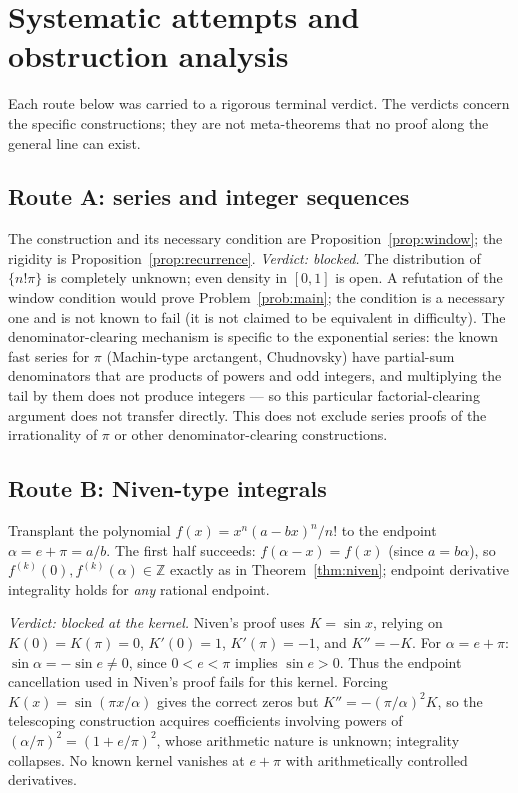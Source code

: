 \documentclass[11pt]{amsart}
\theoremstyle{definition}
\theoremstyle{remark}
\numberwithin{equation}{section}
\newcommand{\Z}{\mathbb{Z}}
\begin{document}
\section{Systematic attempts and obstruction analysis}\label{sec:obstructions}

Each route below was carried to a rigorous terminal verdict. The verdicts concern the specific constructions; they are not meta-theorems that no proof along the general line can exist.

\subsection{Route A: series and integer sequences}

The construction and its necessary condition are Proposition~\ref{prop:window}; the rigidity is Proposition~\ref{prop:recurrence}. \emph{Verdict: blocked.} The distribution of $\{n!\pi\}$ is completely unknown; even density in $[0,1]$ is open. A refutation of the window condition would prove Problem~\ref{prob:main}; the condition is a necessary one and is not known to fail (it is not claimed to be equivalent in difficulty). The denominator-clearing mechanism is specific to the exponential series: the known fast series for $\pi$ (Machin-type arctangent, Chudnovsky) have partial-sum denominators that are products of powers and odd integers, and multiplying the tail by them does not produce integers --- so this particular factorial-clearing argument does not transfer directly. This does not exclude series proofs of the irrationality of $\pi$ or other denominator-clearing constructions.

\subsection{Route B: Niven-type integrals}

Transplant the polynomial $f(x)=x^n(a-bx)^n/n!$ to the endpoint $\alpha=e+\pi=a/b$. The first half succeeds: $f(\alpha-x)=f(x)$ (since $a=b\alpha$), so $f^{(k)}(0),f^{(k)}(\alpha)\in\Z$ exactly as in Theorem~\ref{thm:niven}; endpoint derivative integrality holds for \emph{any} rational endpoint.

\emph{Verdict: blocked at the kernel.} Niven's proof uses $K=\sin x$, relying on $K(0)=K(\pi)=0$, $K'(0)=1$, $K'(\pi)=-1$, and $K''=-K$. For $\alpha=e+\pi$: $\sin\alpha=-\sin e\ne0$, since $0<e<\pi$ implies $\sin e>0$. Thus the endpoint cancellation used in Niven's proof fails for this kernel. Forcing $K(x)=\sin(\pi x/\alpha)$ gives the correct zeros but $K''=-(\pi/\alpha)^2K$, so the telescoping construction acquires coefficients involving powers of $(\alpha/\pi)^2=(1+e/\pi)^2$, whose arithmetic nature is unknown; integrality collapses. No known kernel vanishes at $e+\pi$ with arithmetically controlled derivatives.
\end{document}
